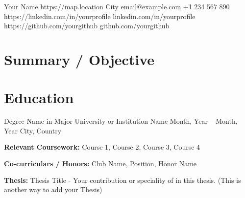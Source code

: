 \documentclass[11pt, a4paper]{article}
\begin{document}

\resumeHeader
    {Your Name}
    {https://map.location}
    {City}
    {email@example.com}
    {+1 234 567 890}
    {https://linkedin.com/in/yourprofile}
    {linkedin.com/in/yourprofile}
    {https://github.com/yourgithub}
    {github.com/yourgithub}



\section{Summary / Objective}


\section{Education}
\resumeEducation
    {Degree Name in Major}
    {University or Institution Name}
    {Month, Year – Month, Year}
    {City, Country}
    {
        \item \textbf{Relevant Coursework:} Course 1, Course 2, Course 3, Course 4
        \item \textbf{Co-curriculars / Honors:} Club Name, Position, Honor Name
        \item \textbf{Thesis:} Thesis Title - Your contribution or speciality of in this thesis. (This is another way to add your Thesis)
    }
\end{document}
